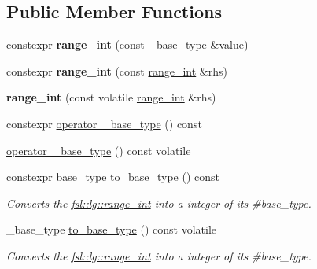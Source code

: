 \subsection*{Public Member Functions}
\begin{DoxyCompactItemize}
\item 
\mbox{\label{classfsl_1_1lg_1_1range__int_a1a1400253adfd449299c41cea331ee61}} 
constexpr {\bfseries range\+\_\+int} (const \+\_\+base\+\_\+type \&value)
\item 
\mbox{\label{classfsl_1_1lg_1_1range__int_ac94eba99f33ff5f811ed046f148f51b0}} 
constexpr {\bfseries range\+\_\+int} (const \mbox{\hyperlink{classfsl_1_1lg_1_1range__int}{range\+\_\+int}} \&rhs)
\item 
\mbox{\label{classfsl_1_1lg_1_1range__int_a03fab3b7204b1c251acb6053d72181ac}} 
{\bfseries range\+\_\+int} (const volatile \mbox{\hyperlink{classfsl_1_1lg_1_1range__int}{range\+\_\+int}} \&rhs)
\item 
constexpr \mbox{\hyperlink{classfsl_1_1lg_1_1range__int_a08cd60e0694d2a7a29d86221dc6a702b}{operator \+\_\+base\+\_\+type}} () const
\item 
\mbox{\hyperlink{classfsl_1_1lg_1_1range__int_a0ccee23a812d577e62cedf54d5633792}{operator \+\_\+base\+\_\+type}} () const volatile
\item 
\mbox{\label{classfsl_1_1lg_1_1range__int_ac34c6bfd6650ef7bce0f4f5be588d379}} 
constexpr base\+\_\+type \mbox{\hyperlink{classfsl_1_1lg_1_1range__int_ac34c6bfd6650ef7bce0f4f5be588d379}{to\+\_\+base\+\_\+type}} () const
\begin{DoxyCompactList}\small\item\em Converts the \mbox{\hyperlink{classfsl_1_1lg_1_1range__int}{fsl\+::lg\+::range\+\_\+int}} into a integer of its \#base\+\_\+type. \end{DoxyCompactList}\item 
\mbox{\label{classfsl_1_1lg_1_1range__int_a7c2df5c4c281ebf98452d2424bb06439}} 
\+\_\+base\+\_\+type \mbox{\hyperlink{classfsl_1_1lg_1_1range__int_a7c2df5c4c281ebf98452d2424bb06439}{to\+\_\+base\+\_\+type}} () const volatile
\begin{DoxyCompactList}\small\item\em Converts the \mbox{\hyperlink{classfsl_1_1lg_1_1range__int}{fsl\+::lg\+::range\+\_\+int}} into a integer of its \#base\+\_\+type. \end{DoxyCompactList}\item 

\end{DoxyCompactItemize}

